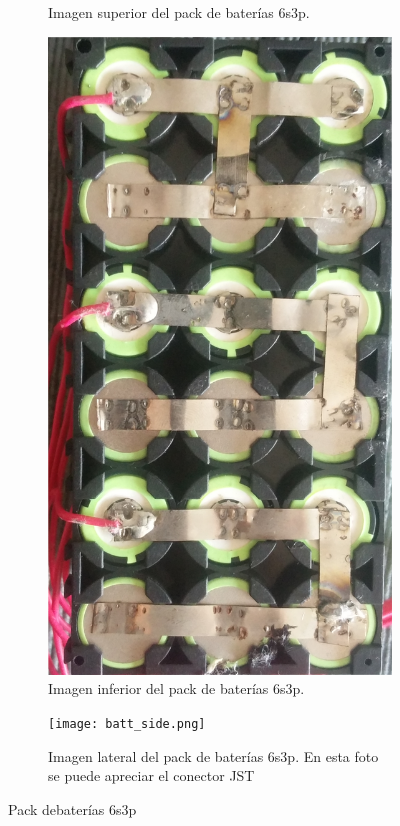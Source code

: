 \documentclass[10pt, a4paper]{report}
\begin{document}
\begin{figure}[h!]
\begin{subfigure}[t]{.3\textwidth}
\begin{center}
	\end{center}
    \caption{Imagen superior del pack de bater\'ias 6s3p. 
    }
	\label{battery_top}
    \end{subfigure}%
    \begin{subfigure}[t]{.3\textwidth}
	\centering
	\includegraphics[width=.9\textwidth]{battery_bot.png}
	\caption{Imagen inferior del pack de bater\'ias 6s3p.}
	\label{battery_bot}
    \end{subfigure}
    \begin{subfigure}[t]{.3\textwidth}
	\centering
	\texttt{[image: batt\_side.png]}
	\caption{Imagen lateral del pack de bater\'ias 6s3p. En esta foto se puede
    apreciar el conector JST}
	\label{battery_side}
    \end{subfigure}
    \label{battery_pack}
    \caption{Pack debaterías 6s3p}
\end{figure}
\FloatBarrier
\end{document}
